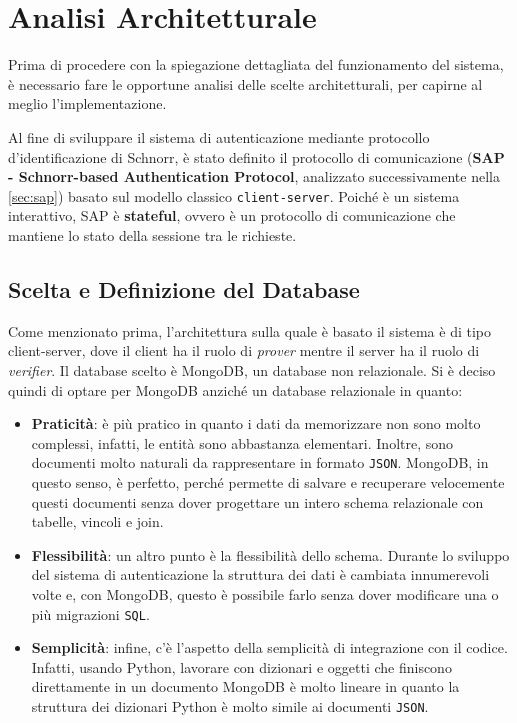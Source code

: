 \newpage
\section{Analisi Architetturale}

Prima di procedere con la spiegazione dettagliata del funzionamento del sistema, è necessario fare le opportune analisi delle scelte architetturali, per capirne al meglio l'implementazione.

Al fine di sviluppare il sistema di autenticazione mediante protocollo d'identificazione di Schnorr, è stato definito il protocollo di comunicazione (\textbf{SAP - Schnorr-based Authentication Protocol}, analizzato successivamente nella \autoref{sec:sap}) basato sul modello classico \texttt{client-server}. Poiché è un sistema interattivo, SAP è \textbf{stateful}, ovvero è un protocollo di comunicazione che mantiene lo stato della sessione tra le richieste.

\subsection{Scelta e Definizione del Database}\label{sec:mongo}

Come menzionato prima, l'architettura sulla quale è basato il sistema è di tipo client-server, dove il client ha il ruolo di \textit{prover} mentre il server ha il ruolo di \textit{verifier}. Il database scelto è MongoDB, un database non relazionale. Si è deciso quindi di optare per MongoDB anziché un database relazionale in quanto:
\begin{itemize}
    \item \textbf{Praticità}: è più pratico in quanto i dati da memorizzare non sono molto complessi, infatti, le entità sono abbastanza elementari. Inoltre, sono documenti molto naturali da rappresentare in formato \texttt{JSON}. MongoDB, in questo senso, è perfetto, perché permette di salvare e recuperare velocemente questi documenti senza dover progettare un intero schema relazionale con tabelle, vincoli e join.
    \item \textbf{Flessibilità}: un altro punto è la flessibilità dello schema. Durante lo sviluppo del sistema di autenticazione la struttura dei dati è cambiata innumerevoli volte e, con MongoDB, questo è possibile farlo senza dover modificare una o più migrazioni \texttt{SQL}.
    \item \textbf{Semplicità}: infine, c'è l'aspetto della semplicità di integrazione con il codice. Infatti, usando Python, lavorare con dizionari e oggetti che finiscono direttamente in un documento MongoDB è molto lineare in quanto la struttura dei dizionari Python è molto simile ai documenti \texttt{JSON}.
\end{itemize}

